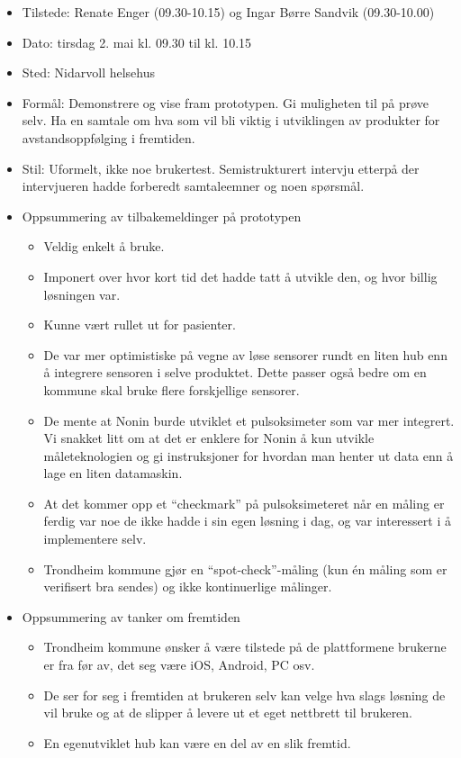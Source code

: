 \def\tightlist{}

\begin{itemize}
\tightlist
\item
  Tilstede: Renate Enger (09.30-10.15) og Ingar Børre Sandvik
  (09.30-10.00)
\item
  Dato: tirsdag 2. mai kl. 09.30 til kl. 10.15
\item
  Sted: Nidarvoll helsehus
\item
  Formål: Demonstrere og vise fram prototypen. Gi muligheten til på
  prøve selv. Ha en samtale om hva som vil bli viktig i utviklingen av
  produkter for avstandsoppfølging i fremtiden.
\item
  Stil: Uformelt, ikke noe brukertest. Semistrukturert intervju etterpå
  der intervjueren hadde forberedt samtaleemner og noen spørsmål.
\item
  Oppsummering av tilbakemeldinger på prototypen

  \begin{itemize}
  \tightlist
  \item
    Veldig enkelt å bruke.
  \item
    Imponert over hvor kort tid det hadde tatt å utvikle den, og hvor
    billig løsningen var.
  \item
    Kunne vært rullet ut for pasienter.
  \item
    De var mer optimistiske på vegne av løse sensorer rundt en liten hub
    enn å integrere sensoren i selve produktet. Dette passer også bedre
    om en kommune skal bruke flere forskjellige sensorer.
  \item
    De mente at Nonin burde utviklet et pulsoksimeter som var mer
    integrert. Vi snakket litt om at det er enklere for Nonin å kun
    utvikle måleteknologien og gi instruksjoner for hvordan man henter
    ut data enn å lage en liten datamaskin.
  \item
    At det kommer opp et ``checkmark'' på pulsoksimeteret når en måling
    er ferdig var noe de ikke hadde i sin egen løsning i dag, og var
    interessert i å implementere selv.
  \item
    Trondheim kommune gjør en ``spot-check''-måling (kun én måling som
    er verifisert bra sendes) og ikke kontinuerlige målinger.
  \end{itemize}
\item
  Oppsummering av tanker om fremtiden

  \begin{itemize}
  \tightlist
  \item
    Trondheim kommune ønsker å være tilstede på de plattformene brukerne
    er fra før av, det seg være iOS, Android, PC osv.
  \item
    De ser for seg i fremtiden at brukeren selv kan velge hva slags
    løsning de vil bruke og at de slipper å levere ut et eget nettbrett
    til brukeren.
  \item
    En egenutviklet hub kan være en del av en slik fremtid.
  \end{itemize}
\end{itemize}

